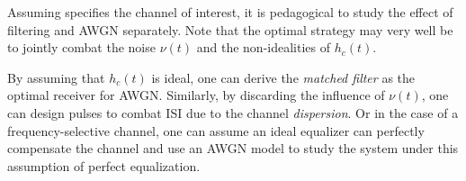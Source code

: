 
%
%



Assuming  specifies the channel of interest, it is pedagogical to study the effect of filtering and AWGN separately.
Note that the optimal strategy may very well be to jointly combat the noise $\nu(t)$ and the non-idealities of $h_c(t)$. 


By assuming that $h_c(t)$ is ideal, one can derive the \emph{matched filter} as the optimal receiver for AWGN. Similarly, by discarding the influence of $\nu(t)$, one can design pulses to combat ISI due to the channel \emph{dispersion}. Or in the case of a frequency-selective channel, one can assume an ideal equalizer can perfectly compensate the channel and use an AWGN model to study the system under this assumption of perfect equalization.

